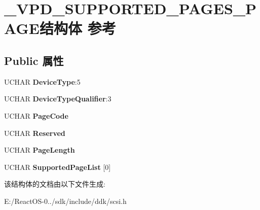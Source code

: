 \hypertarget{struct___v_p_d___s_u_p_p_o_r_t_e_d___p_a_g_e_s___p_a_g_e}{}\section{\+\_\+\+V\+P\+D\+\_\+\+S\+U\+P\+P\+O\+R\+T\+E\+D\+\_\+\+P\+A\+G\+E\+S\+\_\+\+P\+A\+G\+E结构体 参考}
\label{struct___v_p_d___s_u_p_p_o_r_t_e_d___p_a_g_e_s___p_a_g_e}
\subsection*{Public 属性}
\begin{DoxyCompactItemize}
\item 
\mbox{\label{struct___v_p_d___s_u_p_p_o_r_t_e_d___p_a_g_e_s___p_a_g_e_ab6ddc545de2237668111cf7453df886c}} 
U\+C\+H\+AR {\bfseries Device\+Type}\+:5
\item 
\mbox{\label{struct___v_p_d___s_u_p_p_o_r_t_e_d___p_a_g_e_s___p_a_g_e_a651d435ea39754582ce157c6add91af9}} 
U\+C\+H\+AR {\bfseries Device\+Type\+Qualifier}\+:3
\item 
\mbox{\label{struct___v_p_d___s_u_p_p_o_r_t_e_d___p_a_g_e_s___p_a_g_e_aa5f8d1069bcc867d7abf9859532b9ece}} 
U\+C\+H\+AR {\bfseries Page\+Code}
\item 
\mbox{\label{struct___v_p_d___s_u_p_p_o_r_t_e_d___p_a_g_e_s___p_a_g_e_aaf4a20eba6fc60ea7ee61764db50a4e2}} 
U\+C\+H\+AR {\bfseries Reserved}
\item 
\mbox{\label{struct___v_p_d___s_u_p_p_o_r_t_e_d___p_a_g_e_s___p_a_g_e_ad272cfc8e85ebfb6cd55740c8fe2dcb1}} 
U\+C\+H\+AR {\bfseries Page\+Length}
\item 
\mbox{\label{struct___v_p_d___s_u_p_p_o_r_t_e_d___p_a_g_e_s___p_a_g_e_acbe01d0be85da3f08258cd839a4fa498}} 
U\+C\+H\+AR {\bfseries Supported\+Page\+List} \mbox{[}0\mbox{]}
\end{DoxyCompactItemize}


该结构体的文档由以下文件生成\+:\begin{DoxyCompactItemize}
\item 
E\+:/\+React\+O\+S-\/0../sdk/include/ddk/scsi.\+h\end{DoxyCompactItemize}

